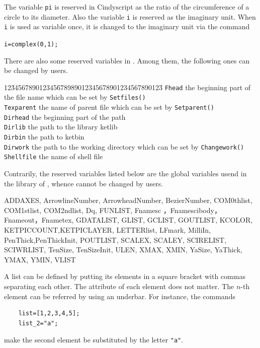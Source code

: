 \documentclass[papersize,a4paper,12pt]{article}
\begin{document}
The variable \verb|pi| is reserved in Cindyscript 
as the ratio of the circumference of a circle to its diameter. 
Also the variable \verb|i| is reserved 
as the imaginary unit. 
When \verb|i| is used as variable once, 
it is changed to the imaginary unit via the command 
\begin{center}
\verb|i=complex(0,1);|
\end{center}

There are also some reserved variables in \ketcindy . 
Among them, the following ones can be changed by users. 
\begin{tabbing}
12\=3456789012345\=678989012345678901234567890123\=\kill
\>\verb|Fhead|  \>the beginning part of the file name 
which can be set by  \verb|Setfiles()|\\
\>\verb|Texparent|  \>the name of parent file 
which can be set by \verb|Setparent()|\\
\>\verb|Dirhead|  \>the beginning part of the path\\
\>\verb|Dirlib|  \>the path to the library ketlib\\
\>\verb|Dirbin|  \>the path to ketbin\\
\>\verb|Dirwork|  \>the path to the working directory 
which can be set by \verb|Changework()|\\
\>\verb|Shellfile|  \>the name of shell file
\end{tabbing}
Contrarily, the reserved variables listed below are the global variables 
usend in the library of \ketcindy , whence cannot be changed 
by users. 

\vspace{\baselineskip}
\noindent 
ADDAXES, ArrowlineNumber, ArrowheadNumber, BezierNumber, COM0thlist, COM1stlist, COM2ndlist, Dq, FUNLIST, Fnamesc ，Fnamescibody，Fnameout，Fnametex, GDATALIST, GLIST, GCLIST, GOUTLIST, KCOLOR, KETPICCOUNT,KETPICLAYER, LETTERlist, LFmark, MilliIn, PenThick,PenThickInit,  POUTLIST, SCALEX, SCALEY, SCIRELIST, SCIWRLIST, TenSize, TenSizeInit, ULEN, XMAX, XMIN, YaSize, YaThick,   YMAX, YMIN, VLIST

\vspace{\baselineskip}

A list can be defined by putting its elements in a square bracket 
with commas separating each other. 
The attribute of each element does not matter. 
The $n$-th element can be referred by using an underbar. 
For instance, the commands 

\begin{verbatim}
    list=[1,2,3,4,5];
    list_2="a";
\end{verbatim}
make the second element be substituted by the letter \verb|"a"|. 
\end{document}
